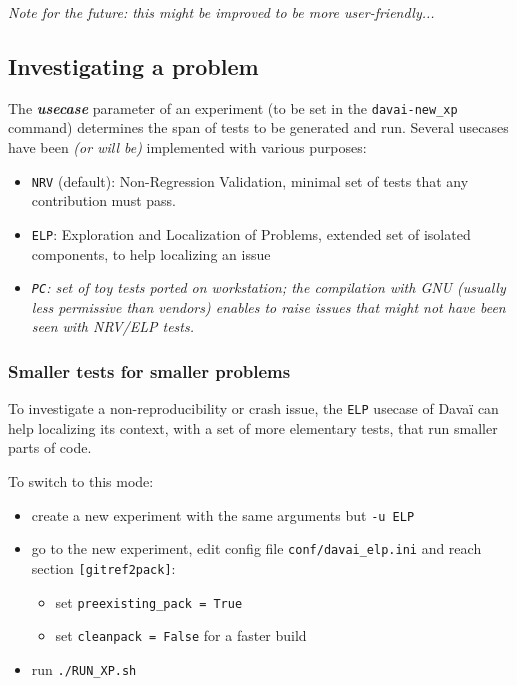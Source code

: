 \documentclass[a4paper,10pt,twoside]{article}
\begin{document}
\textit{Note for the future: this might be improved to be more user-friendly...}



\subsection{\label{sect:investigating}Investigating a problem}

The \textit{\textbf{usecase}} parameter of an experiment (to be set in the \texttt{davai-new\_xp} command) determines the span of tests to be generated and run. Several usecases have been \textit{(or will be)} implemented with various purposes:
  \begin{itemize}
   \item \texttt{NRV} (default): Non-Regression Validation, minimal set of tests that any contribution must pass.
   \item \texttt{ELP}: Exploration and Localization of Problems, extended set of isolated components, to help localizing an issue
   \item \textit{\texttt{PC}: set of toy tests ported on workstation; the compilation with GNU (usually less permissive than vendors) enables to raise issues that might not have been seen with NRV/ELP tests.}
  \end{itemize}

\subsubsection*{Smaller tests for smaller problems}

To investigate a non-reproducibility or crash issue, the \texttt{ELP} usecase of Davaï can help localizing its context, with a set of more elementary tests, that run smaller parts of code.

\noindent To switch to this mode:
\begin{itemize}
 \item create a new experiment with the same arguments but \texttt{-u ELP}
 \item go to the new experiment, edit config file \texttt{conf/davai\_elp.ini} and reach section \texttt{[gitref2pack]}:
 \begin{itemize}
  \item set \texttt{preexisting\_pack = True}
  \item set \texttt{cleanpack = False} for a faster build
 \end{itemize}
 \item run \texttt{./RUN\_XP.sh}
\end{itemize}
\end{document}
